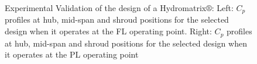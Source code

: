  

\begin{figure}[h!]
\begin{minipage}[b]{0.5\linewidth}
 \centering
\end{minipage}
\begin{minipage}[b]{0.5\linewidth}
 \centering
\end{minipage}

\caption{Experimental Validation of the design of a Hydromatrix$\circledR$:  Left: $C_p$ profiles at hub, mid-span and shroud positions for the selected design when it operates at the FL operating point.  Right: $C_p$ profiles at hub, mid-span and shroud positions for the selected design when it operates at the PL operating point}
\label{exp.PL.FL}
\end{figure}

